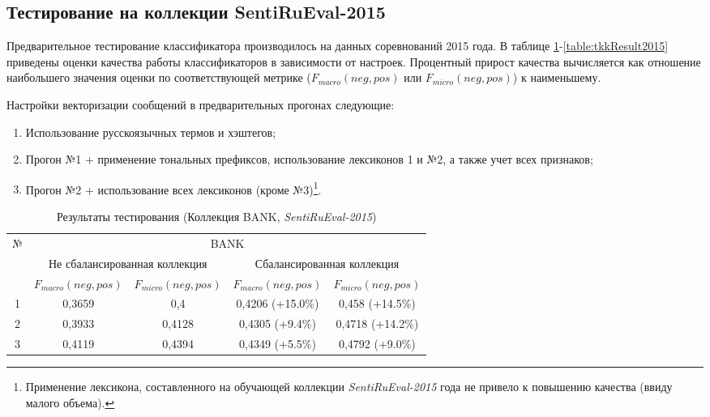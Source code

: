 \newpage
\subsection{Тестирование на коллекции SentiRuEval-2015}
Предварительное тестирование классификатора производилось на данных
соревнований 2015 года.
В таблице \ref{table:bankResult2015}-\ref{table:tkkResult2015} приведены оценки
качества работы классификаторов в зависимости от настроек.
Процентный прирост качества вычисляется как отношение наибольшего значения оценки по
соответствующей метрике ($F_{macro}(neg, pos)$ или $F_{micro}(neg, pos)$) к
наименьшему.

Настройки векторизации сообщений в предварительных прогонах следующие:
\begin{enumerate}
    \item Использование русскоязычных термов и хэштегов;
    \item Прогон №1 + применение тональных префиксов, использование лексиконов 1
        и №2, а также учет всех признаков;
    \item Прогон №2 + использование всех лексиконов (кроме №3)\footnote{
        Применение лексикона, составленного на обучающей коллекции {\it SentiRuEval-2015}
        года не привело к повышению качества (ввиду малого объема).
    }.
\end{enumerate}

\begin{table}[ht!]
\centering
\caption{Результаты тестирования (Коллекция BANK, {\it SentiRuEval-2015})}
\label{table:bankResult2015}
\begin{tabular}{|c|c|c|c|c|}
\hline
\multirow{3}{*}{№} & \multicolumn{4}{c|}{BANK}                                                               \\ \cline{2-5}
                   & \multicolumn{2}{c|}{Не сбалансированная коллекция} & \multicolumn{2}{c|}{Сбалансированная коллекция} \\ \cline{2-5}
                   & $F_{macro}(neg, pos)$    & $F_{micro}(neg, pos)$   & $F_{macro}(neg, pos)$  & $F_{micro}(neg, pos)$  \\ \hline
1                  & 0,3659                   & 0,4                     & 0,4206 (+15.0\%)       & 0,458 (+14.5\%)        \\ \hline
2                  & 0,3933                   & 0,4128                  & 0,4305 (+9.4\%)        & 0,4718 (+14.2\%)       \\ \hline
3                  & 0,4119                   & 0,4394                  & 0,4349 (+5.5\%)        & 0,4792 (+9.0\%)        \\ \hline
\end{tabular}
\end{table}

